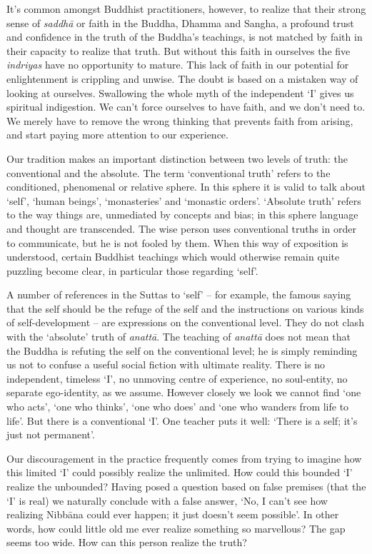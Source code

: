 It's common amongst Buddhist practitioners, however, to realize that
their strong sense of \emph{saddhā} or faith in the Buddha, Dhamma and
Sangha, a profound trust and confidence in the truth of the Buddha's
teachings, is not matched by faith in their capacity to realize that
truth. But without this faith in ourselves the five \emph{indriyas} have
no opportunity to mature. This lack of faith in our potential for
enlightenment is crippling and unwise. The doubt is based on a mistaken
way of looking at ourselves. Swallowing the whole myth of the
independent `I' gives us spiritual indigestion. We can't force ourselves
to have faith, and we don't need to. We merely have to remove the wrong
thinking that prevents faith from arising, and start paying more
attention to our experience. 

Our tradition makes an important distinction between two levels of
truth: the conventional and the absolute. The term `conventional truth'
refers to the conditioned, phenomenal or relative sphere. In this sphere
it is valid to talk about `self', `human beings', `monasteries' and
`monastic orders'. `Absolute truth' refers to the way things are, 
unmediated by concepts and bias; in this sphere language and thought are
transcended. The wise person uses conventional truths in order to
communicate, but he is not fooled by them. When this way of exposition
is understood, certain Buddhist teachings which would otherwise remain
quite puzzling become clear, in particular those regarding `self'. 

A number of references in the Suttas to `self' -- for example, the
famous saying that the self should be the refuge of the self and the
instructions on various kinds of self-development -- are expressions on
the conventional level. They do not clash with the `absolute' truth of
\emph{anattā}. The teaching of \emph{anattā} does not mean that the
Buddha is refuting the self on the conventional level; he is simply
reminding us not to confuse a useful social fiction with ultimate
reality. There is no independent, timeless `I', no unmoving centre of
experience, no soul-entity, no separate ego-identity, as we assume. 
However closely we look we cannot find `one who acts', `one who thinks', 
`one who does' and `one who wanders from life to life'. But there is a
conventional `I'. One teacher puts it well: `There is a self; it's just
not permanent'. 

Our discouragement in the practice frequently comes from trying to
imagine how this limited `I' could possibly realize the unlimited. How
could this bounded `I' realize the unbounded? Having posed a question
based on false premises (that the `I' is real) we naturally conclude
with a false answer, `No, I can't see how realizing Nibbāna could ever
happen; it just doesn't seem possible'. In other words, how could little
old me ever realize something so marvellous? The gap seems too wide. How
can this person realize the truth? 

